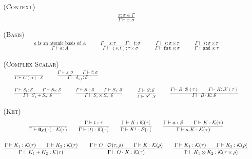 \documentclass[manuscript, review, timestamp]{acmart}
\newcommand*{\Sc}{\mathcal{S}}
\newcommand*{\K}{\mathcal{K}}
\newcommand*{\B}{\mathcal{B}}
\newcommand*{\Op}{\mathcal{O}}
\newcommand*{\fst}{\texttt{fst }}
\newcommand*{\snd}{\texttt{snd }}
\begin{document}
\textsc{(Context)}
\begin{gather*}
  \frac{x : \sigma \in \Gamma}{\Gamma \vdash x : \sigma}
\end{gather*}

\textsc{(Basis)}
\begin{gather*}
  \frac{a \text{ is an atomic basis of } A}{\Gamma \vdash a : A}
  \qquad
  \frac{\Gamma \vdash s : \tau \qquad \Gamma \vdash t : \sigma}{\Gamma \vdash (s, t) :  \tau \times \sigma }
  \qquad
  \frac{\Gamma \vdash s : \sigma \times \tau }{\Gamma \vdash \fst s : \sigma}
  \qquad
  \frac{\Gamma \vdash s : \sigma \times \tau }{\Gamma \vdash \snd s : \tau}
\end{gather*}

\textsc{(Complex Scalar)}
\begin{gather*}
  \frac{}{\Gamma \vdash C(\alpha) : \Sc}
  \qquad
  \frac{\Gamma \vdash s : \sigma \qquad \Gamma \vdash t : \sigma}{\Gamma \vdash \delta_{s, t} : \Sc} \\
  \\
  \frac{\Gamma \vdash S_1 : \Sc \qquad \Gamma \vdash S_2 : \Sc }{\Gamma \vdash S_1 + S_2 : \Sc }
  \qquad
  \frac{\Gamma \vdash S_1 : \Sc \qquad \Gamma \vdash S_2 : \Sc}{\Gamma \vdash S_1 \times S_2 : \Sc}
  \qquad
  \frac{\Gamma \vdash S : \Sc}{\Gamma \vdash S^* : \Sc}
  \qquad
  \frac{\Gamma \vdash B: \B(\tau) \qquad \Gamma \vdash K : \K(\tau) }{\Gamma \vdash B \cdot K : \Sc }
\end{gather*}

\textsc{(Ket)}
\begin{gather*}
  \frac{}{\Gamma \vdash \mathbf{0}_{\mathcal{K}}(\tau) : \K(\tau)}
  \qquad
  \frac{\Gamma \vdash t : \tau}{\Gamma \vdash \ket{t} : \K(\tau)}
  \qquad
  \frac{\Gamma \vdash K : \K(\tau)}{\Gamma \vdash K^\dagger : \B(\tau)}
  \qquad
  \frac{\Gamma \vdash a : \Sc \qquad \Gamma \vdash K : \K(\tau)}{\Gamma \vdash a . K : \K(\tau)} \\
  \\
  \frac{\Gamma \vdash K_1 : \K(\tau) \qquad \Gamma \vdash K_2 : \K(\tau) }{\Gamma \vdash K_1 + K_2 : \K(\tau) }
  \qquad
  \frac{\Gamma \vdash O : \Op(\tau, \rho) \qquad \Gamma \vdash K : \K(\rho) }{\Gamma \vdash O \cdot K : \K(\tau) }
  \qquad
  \frac{\Gamma \vdash K_1 : \K(\tau) \qquad \Gamma \vdash K_2 : \K(\rho) }{\Gamma \vdash K_1 \otimes K_2 : \K(\tau \times \rho)}
\end{gather*}
\end{document}
